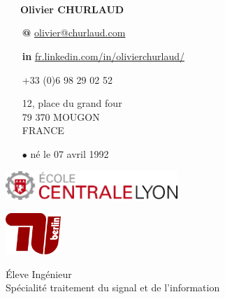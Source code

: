 \documentclass[skip,a4paper]{article}
\begin{document}
	\fontsize{8.5}{9.5}
	\selectfont

\begin{minipage}[c][4cm]{2.2cm}
	~\\~\\
	\vfill
	~
\end{minipage}
\begin{minipage}[c][4cm]{5.5cm}
	~~~\textbf{Olivier CHURLAUD}
	\footnotesize
	\begin{itemize}
		\item[\bfseries @] \url{olivier@churlaud.com}
		\item[\bfseries \color{blue} in] {\scriptsize\url{ fr.linkedin.com/in/olivierchurlaud/}}
		\item[\Telefon]+33 (0)6 98 29 02 52
		\item[\Letter] 12, place du grand four \\
		79 370 MOUGON \\ 
		FRANCE
		\item[$\bullet$] né le 07 avril 1992
	\end{itemize}
\end{minipage}

\begin{minipage}[c][4cm]{10cm}
	\begin{minipage}[c]{7.10cm}
		\includegraphics[width=6.5cm]{img/ecl}
	\end{minipage}
	\hfill
	\begin{minipage}[c]{2.5cm}
		\includegraphics[width=2.1cm]{img/tuberlin}
	\end{minipage}
	
	\vfill
	
	\centering
	\LARGE
	\'Eleve Ingénieur\\
	Spécialité traitement du signal et de l'information
\end{minipage}
\end{document}
